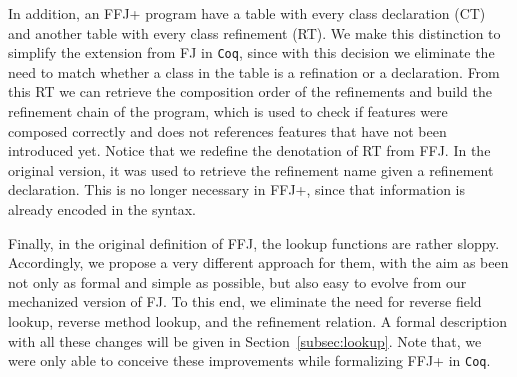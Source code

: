 In addition, an \ac{FFJ+} program have a table with every class 
declaration (\textsf{CT}) and another table with every class refinement (\textsf{RT}).
We make this distinction to simplify the extension from \ac{FJ} in \texttt{Coq}, since 
with this decision we eliminate the need to match whether a class in the table 
is a refination or a declaration. From this \textsf{RT} we can retrieve the composition order
of the refinements and build the refinement chain of the program, 
which is used to check if features were composed correctly and
does not references features that have not been introduced yet. 
Notice that we redefine the denotation of \textsf{RT} from \ac{FFJ}.
In the original version, it was used to retrieve the refinement name given a 
refinement declaration. This is no longer necessary in \ac{FFJ+}, since
that information is already encoded in the syntax.

Finally, in the original definition of \ac{FFJ}, the lookup functions are 
rather sloppy. Accordingly, we propose a very different approach
for them, with the aim as been not only as formal and simple as possible, 
but also easy to evolve from our mechanized version of \ac{FJ}. 
To this end, we eliminate the need for reverse field lookup, reverse method lookup, 
and the refinement relation. A formal description with all these changes 
will be given in Section~\ref{subsec:lookup}. Note that, we were only 
able to conceive these improvements while formalizing \ac{FFJ+} in 
\texttt{Coq}. 


